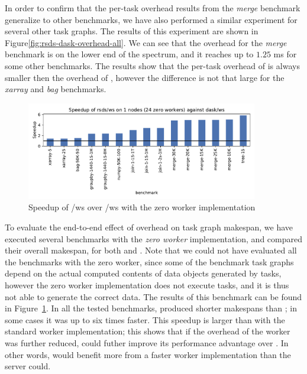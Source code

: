 In order to confirm that the per-task overhead results from the \emph{merge}
benchmark generalize to other benchmarks, we have also performed a similar experiment for several
other task graphs. The results of this experiment are shown in Figure\ref{fig:rsds-dask-overhead-all}.
We can see that the overhead for the \emph{merge} benchmark is on the lower end of
the spectrum, and it reaches up to $1.25$ ms for some other benchmarks. The
results show that the per-task overhead of \rsds{} is always smaller then the
overhead of \dask{}, however the difference is not that large for the
\emph{xarray} and \emph{bag} benchmarks.

\begin{figure}
	\centering
	\includegraphics[width=0.9\textwidth]{./imgs/rsds/charts/speedup-zw-rsds-ws-1}
	\caption{Speedup of \rsds{}/ws over \dask{}/ws with the zero worker
	implementation}
	\label{fig:rsds-zero-worker-speedup}
\end{figure}

To evaluate the end-to-end effect of overhead on task graph makespan, we have executed several
benchmarks with the \emph{zero worker} implementation, and compared their overall
makespan, for both \dask{} and \rsds{}. Note that we could
not have evaluated all the benchmarks with the zero worker, since some of the benchmark task graphs
depend on the actual computed contents of data objects generated by tasks, however the zero worker
implementation does not execute tasks, and it is thus not able to generate the correct data. The
results of this benchmark can be found in Figure~\ref{fig:rsds-zero-worker-speedup}. In all the tested
benchmarks, \rsds{} produced shorter makespans than
\dask{}; in some cases it was up to six times faster. This speedup is larger
than with the standard worker implementation; this shows that if the overhead of the worker was
further reduced, \rsds{} could futher improve its performance advantage over
\dask{}. In other words, \rsds{} would benefit more from a
faster worker implementation than the \dask{} server could.

